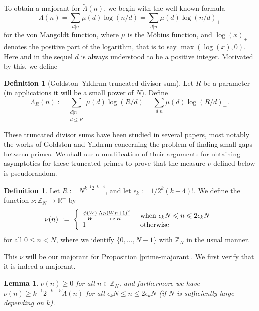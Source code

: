 \documentclass[12pt,a4paper,reqno]{amsart}
\numberwithin{equation}{section}
\theoremstyle{plain}
\newtheorem{lemma}[subsection]{Lemma}
\theoremstyle{definition}
\newtheorem{definition}[subsection]{Definition}
\renewcommand{\leq}{\leqslant}
\renewcommand{\geq}{\geqslant}
\def\Z{{\mathbb Z}}
\def\R{{\mathbb R}}
\def\ni{\noindent}
\def\emph#1{{\it #1}}
\begin{document}
\ni To obtain a majorant for $\tilde \Lambda(n)$, we begin with the well-known formula
\[ \Lambda(n) = \sum_{d|n} \mu(d) \log(n/d) = \sum_{d|n} \mu(d) \log(n/d)_+\]
for the von Mangoldt function, where $\mu$ is the M\"obius function, and $\log(x)_+ $ denotes the positive part of the logarithm, that is to say $\max(\log(x),0)$.  Here and in the sequel $d$ is always understood to be a positive integer.
Motivated by this, we define

\begin{definition}[Goldston--Y{\i}ld{\i}r{\i}m truncated divisor sum]\label{truncated-divisor-sum} Let $R$ be a parameter (in applications it will be a small power of $N$). Define
\[ \Lambda_R(n) := \sum_{\substack{d | n \\ d \leq R}} \mu(d)\log (R/d)
= \sum_{d|n} \mu(d) \log(R/d)_+.\]
\end{definition}

\ni These truncated divisor sums have been studied in several papers, most notably the works of Goldston and Y{\i}ld{\i}r{\i}m 
\cite{goldston-yildirim-old1,goldston-yildirim-old2,goldston-yildirim} concerning the problem of finding small gaps between primes. 
We shall use a modification of their arguments for obtaining asymptotics for these truncated primes to prove that the
measure $\nu$ defined below is pseudorandom.

\begin{definition}\label{mu-def} Let $R := N^{k^{-1}2^{-k-4}}$, and let $\epsilon_k := 1/2^{k}(k+4)!$.  We define the function
$\nu: \Z_N \to \R^+$ by
\[ \nu(n) \; := \; \left\{
\begin{array}{ll}
\frac{\phi(W)}{W} \frac{\Lambda_R(Wn + 1)^2}{\log R} & \hbox{ when } \epsilon_k N \leq n \leq 2\epsilon_k N\\
1 & \hbox{ otherwise}
\end{array}\right.
\]
for all $0 \leq n < N$, where we identify $\{0,\ldots,N-1\}$ with $\Z_N$ in the usual manner.
\end{definition}

\ni This $\nu$ will be our majorant for Proposition \ref{prime-majorant}.  We first verify that it is indeed a majorant.

\begin{lemma}\label{mu-majorises} $\nu(n) \geq 0$ for all $n \in \mathbb{Z}_N$, and furthermore we have $\nu(n) \geq k^{-1}2^{-k-5}\widetilde{\Lambda}(n)$ for all $\epsilon_k N \leq n \leq 2\epsilon_kN$ \emph{(}if $N$ is sufficiently large depending on $k$\emph{)}.
\end{lemma}
\end{document}
